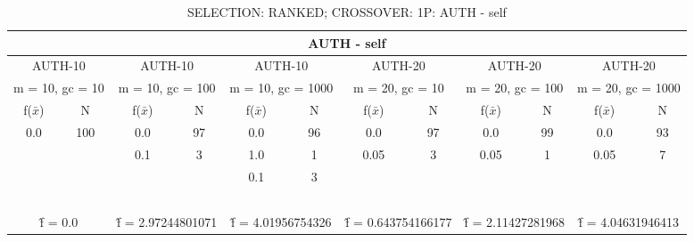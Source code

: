 \begin{table}[H]
	\centering
	\caption{SELECTION: RANKED; CROSSOVER: 1P: AUTH - self}
	\begin{adjustbox}{width=1\textwidth}
		\begin{tabular}{ |c|c||c|c||c|c||c|c||c|c||c|c| }
			\hline
			\multicolumn{12}{|c|}{AUTH - self} \\
			\hline
			\multicolumn{2}{|c||}{AUTH-10} & \multicolumn{2}{c||}{AUTH-10} & \multicolumn{2}{c||}{AUTH-10} & \multicolumn{2}{c||}{AUTH-20} & \multicolumn{2}{c||}{AUTH-20} & \multicolumn{2}{c|}{AUTH-20}\\
			\hline
			\multicolumn{2}{|c||}{m = 10, gc = 10} & \multicolumn{2}{c||}{m = 10, gc = 100} & \multicolumn{2}{c||}{m = 10, gc = 1000} & \multicolumn{2}{c||}{m = 20, gc = 10} & \multicolumn{2}{c||}{m = 20, gc = 100} & \multicolumn{2}{c|}{m = 20, gc = 1000}\\
			\hline
			f($\bar{x}$) & N & f($\bar{x}$) & N & f($\bar{x}$) & N & f($\bar{x}$) & N & f($\bar{x}$) & N & f($\bar{x}$) & N\\
			\hline
			\hline
			0.0 & 100 & 0.0 & 97 & 0.0 & 96 & 0.0 & 97 & 0.0 & 99 & 0.0 & 93\\
			&   & 0.1 & 3 & 1.0 & 1 & 0.05 & 3 & 0.05 & 1 & 0.05 & 7\\
			&   &   &   & 0.1 & 3 &   &   &   &   &   &  \\
			&   &   &   &   &   &   &   &   &   &   &  \\
			&   &   &   &   &   &   &   &   &   &   &  \\
			&   &   &   &   &   &   &   &   &   &   &  \\
			&   &   &   &   &   &   &   &   &   &   &  \\
			&   &   &   &   &   &   &   &   &   &   &  \\
			\hline
			\multicolumn{2}{|c||}{\^{f} = 0.0} & \multicolumn{2}{c||}{\^{f} = 2.97244801071} & \multicolumn{2}{c||}{\^{f} = 4.01956754326} & \multicolumn{2}{c||}{\^{f} = 0.643754166177} & \multicolumn{2}{c||}{\^{f} = 2.11427281968} & \multicolumn{2}{c|}{\^{f} = 4.04631946413}\\
			\hline
		\end{tabular}
	\end{adjustbox}
\end{table}
